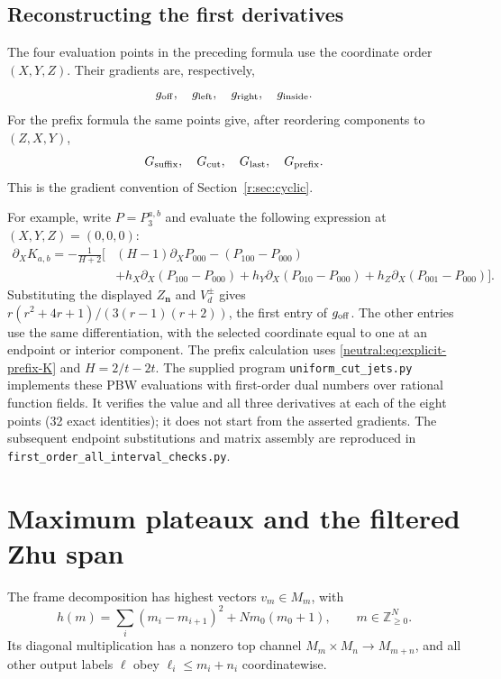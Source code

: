 \documentclass[11pt,a4paper]{article}
\numberwithin{equation}{section}
\theoremstyle{definition}\newtheorem{definition}[theorem]{Definition}
\theoremstyle{remark}\newtheorem{remark}[theorem]{Remark}
\begin{document}
\subsection{Reconstructing the first derivatives}
\label{app:jet-map}
The four evaluation points in the preceding formula use the
coordinate order $(X,Y,Z)$. Their gradients are, respectively,
\[
 g_{\rm off},\quad g_{\rm left},\quad g_{\rm right},\quad g_{\rm inside}.
\]
For the prefix formula the same points give, after reordering
components to $(Z,X,Y)$,
\[
 G_{\rm suffix},\quad G_{\rm cut},\quad G_{\rm last},\quad G_{\rm prefix}.
\]
This is the gradient convention of Section~\ref{r:sec:cyclic}.

For example, write $P=P_3^{a,b}$ and evaluate the following
expression at $(X,Y,Z)=(0,0,0)$:
\begin{align*}
 \partial_XK_{a,b}=-\frac1{H+2}\big[&
 (H-1)\partial_XP_{000}-(P_{100}-P_{000})\\
 &+h_X\partial_X(P_{100}-P_{000})
 +h_Y\partial_X(P_{010}-P_{000})
 +h_Z\partial_X(P_{001}-P_{000})\big].
\end{align*}
Substituting the displayed $Z_{\mathbf n}$ and $V_d^\pm$ gives
$r(r^2+4r+1)/(3(r-1)(r+2))$, the first entry of $g_{\rm off}$.
The other entries use the same differentiation, with the selected
coordinate equal to one at an endpoint or interior component.
The prefix calculation uses
\eqref{neutral:eq:explicit-prefix-K} and $H=2/t-2t$.
The supplied program \texttt{uniform\_cut\_jets.py} implements
these PBW evaluations with first-order dual numbers over rational
function fields. It verifies the value and all three derivatives
at each of the eight points (32 exact identities); it does not
start from the asserted gradients. The subsequent endpoint
substitutions and matrix assembly are reproduced in
\texttt{first\_order\_all\_interval\_checks.py}.



\section{Maximum plateaux and the filtered Zhu span}
\label{v2:plateaux}
\label{neutral:app:filtered-spanning}

The frame decomposition has highest vectors $v_m\in M_m$, with
\[
 h(m)=\sum_i(m_i-m_{i+1})^2+Nm_0(m_0+1),
                         \qquad m\in\mathbb Z_{\geq0}^N.
\]
Its diagonal multiplication has a nonzero top channel $M_m\times
M_n\to M_{m+n}$, and all other output labels $\ell$ obey
$\ell_i\leq m_i+n_i$ coordinatewise.
\end{document}
